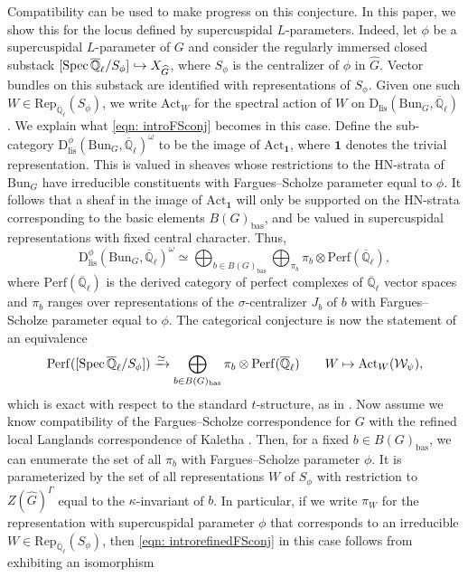 \documentclass[reqno,11pt]{amsart}
\theoremstyle{remark}
\def\Spec{\mathop{\rm Spec}}
\newcommand{\bas}{\mathrm{bas}}
\newcommand{\Act}{\mathrm{Act}}
\newcommand{\Bun}{\mathrm{Bun}}
\newcommand{\Rep}{\mathrm{Rep}}
\newcommand{\Dlis}{\mathrm{D}_{\mathrm{lis}}}
\newcommand{\Perf}{\mathrm{Perf}}
\def\ol{\overline}
\begin{document}
Compatibility can be used to make progress on this conjecture. In this paper, we show this for the locus defined by supercuspidal $L$-parameters. Indeed, let $\phi$ be a supercuspidal $L$-parameter of $G$ and consider the regularly immersed closed substack $[\Spec{\ol{\mathbb{Q}}_{\ell}}/S_{\phi}] \hookrightarrow X_{\widehat{G}}$, where $S_{\phi}$ is the centralizer of $\phi$ in $\hat{G}$. Vector bundles on this substack are identified with representations of $S_{\phi}$. Given one such $W \in \Rep_{\ol{\mathbb{Q}}_{\ell}}(S_{\phi})$, we write $\Act_{W}$ for the spectral action of $W$ on $\Dlis(\Bun_{G},\ol{\mathbb{Q}}_{\ell})$. We explain what \eqref{eqn: introFSconj} becomes in this case. Define the sub-category $\Dlis^{\phi}(\Bun_{G},\ol{\mathbb{Q}}_{\ell})^{\omega}$ to be the image of $\Act_{\mathbf{1}}$, where $\mathbf{1}$ denotes the trivial representation.  This is valued in sheaves whose restrictions to the HN-strata of $\Bun_{G}$ have irreducible constituents with Fargues--Scholze parameter equal to $\phi$. It follows that a sheaf in the image of $\Act_{\mathbf{1}}$ will only be supported on the HN-strata corresponding to the basic elements $B(G)_{\bas}$, and be valued in supercuspidal representations with fixed central character. Thus,
\[ \Dlis^{\phi}(\Bun_{G},\ol{\mathbb{Q}}_{\ell})^{\omega} \simeq \bigoplus_{b \in B(G)_{\bas}} \bigoplus_{\pi_{b}} \pi_{b} \otimes \Perf(\ol{\mathbb{Q}}_{\ell}), \]
where $\Perf(\ol{\mathbb{Q}}_{\ell})$ is the derived category of perfect complexes of $\ol{\mathbb{Q}}_{\ell}$ vector spaces and $\pi_{b}$ ranges over representations of the $\sigma$-centralizer $J_{b}$ of $b$ with Fargues--Scholze parameter equal to $\phi$. The categorical conjecture is now the statement of an equivalence 
\begin{equation}{\label{eqn: introrefinedFSconj}}
    \Perf([\Spec{\ol{\mathbb{Q}}_{\ell}}/S_{\phi}]) \xrightarrow{\simeq} \bigoplus_{b \in B(G)_{\bas}} \pi_{b} \otimes \Perf(\ol{\mathbb{Q}}_{\ell}) \quad \quad W \mapsto \Act_{W}(\mathcal{W}_{\psi}),
\end{equation}
which is exact with respect to the standard $t$-structure, as in \cite[Conjecture~X.2.2]{FS}. Now assume we know compatibility of the Fargues--Scholze  correspondence for $G$ with the refined local Langlands correspondence of Kaletha \cite{Kal}. Then, for a fixed $b \in B(G)_{\bas}$, we can enumerate the set of all $\pi_{b}$ with Fargues--Scholze parameter $\phi$. It is parameterized by the set of all representations $W$ of $S_{\phi}$ with restriction to $Z(\hat{G})^{\Gamma}$ equal to the $\kappa$-invariant of $b$. In particular, if we write $\pi_{W}$ for the representation with supercuspidal parameter $\phi$ that corresponds to an irreducible $W \in \Rep_{\ol{\mathbb{Q}}_{\ell}}(S_{\phi})$, then  \eqref{eqn: introrefinedFSconj} in this case follows from exhibiting an isomorphism
\end{document}
